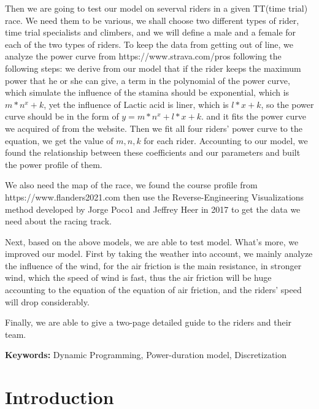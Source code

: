 \documentclass[12pt]{article}
\begin{document}
Then we are going to test our model on severval riders in a given TT(time trial) race. We need them to be various, we shall choose two different types of rider, time trial
specialists and climbers, and we will define a male and a female for each of the two types of riders. To keep the data from getting out of line, we analyze the power curve
from https://www.strava.com/pros following the following steps:
we derive from our model that if the rider keeps the maximum power that he or she can give, a term in the polynomial of the power curve,  which simulate the influence of the stamina should be exponential,
which is $m*n^x+k$, yet the influence of Lactic acid is liner, which is $l*x+k$, so the power curve should be in the form of $y=m*n^x+l*x+k$.
and it fits the power curve we acquired of from the website.
Then we fit all four riders' power curve to the equation, we get the value of $m,n,k$ for each rider. Accounting to our model, we found the relationship between these
coefficients and our parameters and built the power profile of them.

We also need the map of the race, we found the course profile from https://www.flanders2021.com
then use the Reverse-Engineering Visualizations method developed by Jorge Poco1 and Jeffrey Heer in 2017\cite{poco2017reverse} to get the data we need about the racing track.

Next, based on the above models, we are able to test model. What's more, we improved our model. First by taking the weather into account, we mainly analyze the influence of the
wind, for the air friction is the main resistance, in stronger wind, which the speed of wind is fast, thus the air friction will be huge accounting to the equation of the
equation of air friction, and the riders' speed will drop considerably.

Finally, we are able to  give a two-page detailed guide to the riders and their team.

\begin{flushleft}
    \textbf{Keywords:} Dynamic Programming, Power-duration model, Discretization
\end{flushleft}



\clearpage
\pagestyle{fancy}
\tableofcontents
\newpage
\setcounter{page}{1}


\section{Introduction}
\end{document}
